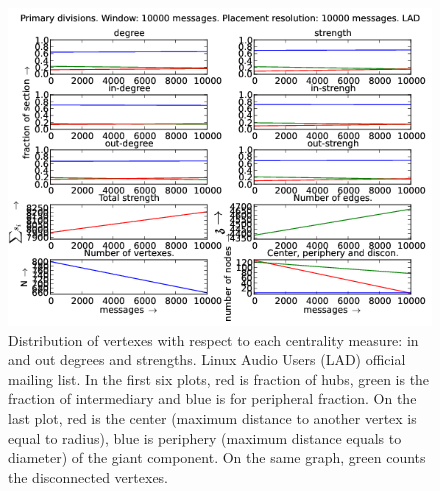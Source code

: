 \documentclass[%
 aip,
 jmp,%
 amsmath,amssymb,
 reprint,%
]{revtex4-1}
\begin{document}
\begin{figure}[hbtp] 
   \centering
        \includegraphics[width=\textwidth]{figs/LAD/10000}
    \caption{Distribution of vertexes with respect to each centrality measure: in and out degrees and strengths. Linux Audio Users (LAD) official mailing list. In the first six plots, red is fraction of hubs, green is the fraction of intermediary and blue is for peripheral fraction. On the last plot, red is the center (maximum distance to another vertex is equal to radius), blue is periphery (maximum distance equals to diameter) of the giant component. On the same graph, green counts the disconnected vertexes.}
    \label{fig:lad10000}
\end{figure}
\end{document}
